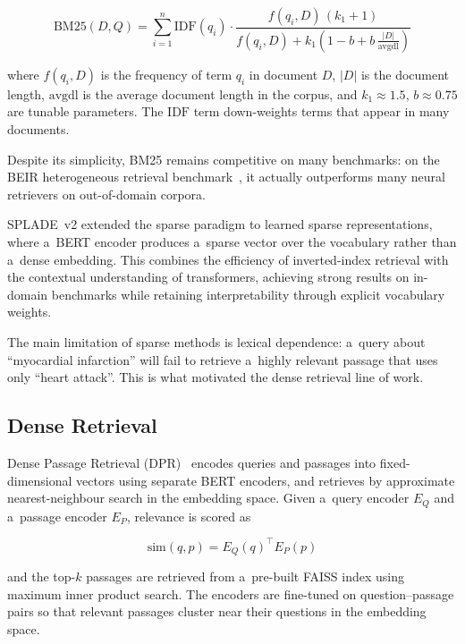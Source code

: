 \begin{equation}
  \text{BM25}(D, Q) = \sum_{i=1}^{n} \text{IDF}(q_i)
    \cdot \frac{f(q_i, D)\,(k_1 + 1)}{f(q_i, D) + k_1\!\left(1 - b + b\,\frac{|D|}{\text{avgdl}}\right)}
  \label{eq:bm25}
\end{equation}

\noindent where $f(q_i, D)$ is the frequency of term $q_i$ in document $D$,
$|D|$ is the document length, $\text{avgdl}$ is the average document length in the
corpus, and $k_1 \approx 1.5$, $b \approx 0.75$ are tunable parameters.
The $\text{IDF}$ term down-weights terms that appear in many documents.

Despite its simplicity, BM25 remains competitive on many benchmarks: on the
BEIR heterogeneous retrieval benchmark~\cite{thakur2021beir}, it actually outperforms
many neural retrievers on out-of-domain corpora.

SPLADE~v2 extended the sparse paradigm to learned sparse representations,
where a~BERT encoder produces a~sparse vector over the vocabulary rather than
a~dense embedding.
This combines the efficiency of inverted-index retrieval with the contextual
understanding of transformers, achieving strong results on in-domain benchmarks
while retaining interpretability through explicit vocabulary weights.

The main limitation of sparse methods is lexical dependence: a~query about
``myocardial infarction'' will fail to retrieve a~highly relevant passage that
uses only ``heart attack''.
This is what motivated the dense retrieval line of work.

\subsection{Dense Retrieval}

Dense Passage Retrieval (DPR)~\cite{karpukhin2020dpr} encodes queries and passages
into fixed-dimensional vectors using separate BERT encoders, and retrieves by
approximate nearest-neighbour search in the embedding space.
Given a~query encoder $E_Q$ and a~passage encoder $E_P$, relevance is scored as

\begin{equation}
  \text{sim}(q, p) = E_Q(q)^\top E_P(p)
  \label{eq:dpr}
\end{equation}

\noindent and the top-$k$ passages are retrieved from a~pre-built FAISS index using
maximum inner product search.
The encoders are fine-tuned on question--passage pairs so that relevant passages
cluster near their questions in the embedding space.

